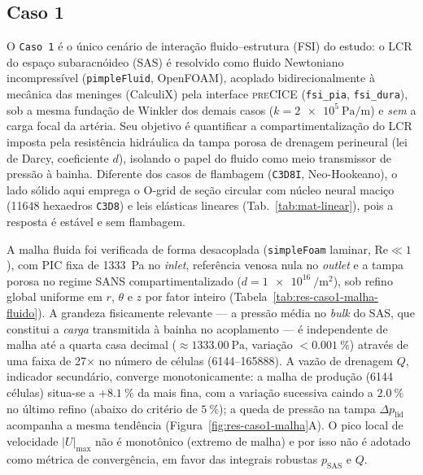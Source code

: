 \documentclass[12pt,a4paper]{article}
\begin{document}
\subsection*{Caso 1}
\label{sec:res-caso1}

O \texttt{Caso 1} é o único cenário de interação fluido--estrutura (FSI) do estudo: o LCR do espaço subaracnóideo (SAS) é resolvido como fluido Newtoniano incompressível (\texttt{pimpleFluid}, OpenFOAM), acoplado bidirecionalmente à mecânica das meninges (CalculiX) pela interface \textsc{preCICE} (\texttt{fsi\_pia}, \texttt{fsi\_dura}), sob a mesma fundação de Winkler dos demais casos ($k = \SI{2e5}{\pascal\per\meter}$) e \emph{sem} a carga focal da artéria. Seu objetivo é quantificar a compartimentalização do LCR imposta pela resistência hidráulica da tampa porosa de drenagem perineural (lei de Darcy, coeficiente $d$), isolando o papel do fluido como meio transmissor de pressão à bainha. Diferente dos casos de flambagem (\texttt{C3D8I}, Neo-Hookeano), o lado sólido aqui emprega o O-grid de seção circular com núcleo neural maciço (\num{11648} hexaedros \texttt{C3D8}) e leis elásticas lineares (Tab.~\ref{tab:mat-linear}), pois a resposta é estável e sem flambagem.

A malha fluida foi verificada de forma desacoplada (\texttt{simpleFoam} laminar, $\mathrm{Re}\ll 1$), com PIC fixa de \SI{1333}{\pascal} no \emph{inlet}, referência venosa nula no \emph{outlet} e a tampa porosa no regime SANS compartimentalizado ($d = \SI{1e16}{\per\meter\squared}$), sob refino global uniforme em $r$, $\theta$ e $z$ por fator inteiro (Tabela~\ref{tab:res-caso1-malha-fluido}). A grandeza fisicamente relevante --- a pressão média no \emph{bulk} do SAS, que constitui a \emph{carga} transmitida à bainha no acoplamento --- é independente de malha até a quarta casa decimal ($\approx \SI{1333.00}{\pascal}$, variação $< \SI{0.001}{\%}$) através de uma faixa de \num{27}$\times$ no número de células (\numrange{6144}{165888}). A vazão de drenagem $Q$, indicador secundário, converge monotonicamente: a malha de produção (\num{6144} células) situa-se a $+\SI{8.1}{\%}$ da mais fina, com a variação sucessiva caindo a $\SI{2.0}{\%}$ no último refino (abaixo do critério de $\SI{5}{\%}$); a queda de pressão na tampa $\Delta p_{\mathrm{lid}}$ acompanha a mesma tendência (Figura~\ref{fig:res-caso1-malha}A). O pico local de velocidade $|U|_{\max}$ não é monotônico (extremo de malha) e por isso não é adotado como métrica de convergência, em favor das integrais robustas $p_{\mathrm{SAS}}$ e $Q$.
\end{document}
